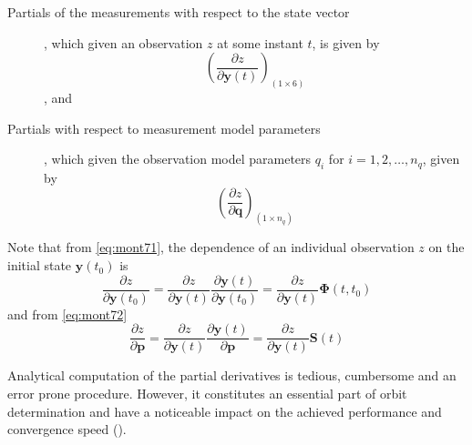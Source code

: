 \begin{description}
  \item[Partials of the measurements with respect to the state vector], which given 
    an observation $z$  at some instant $t$, is given by
    \begin{equation}\label{eq:mont73}
      \left( \frac{\partial z}{\partial \bm{y}(t)} \right) _{(1 \times 6)}
    \end{equation}, and

  \item[Partials with respect to measurement model parameters], which given the observation 
    model parameters $q_i$ for $i=1,2, \dots ,n_q$, given by 
    \begin{equation}\label{eq:mont74}
       \left( \frac{\partial z}{\partial \bm{q}} \right) _{(1 \times n_q)}
    \end{equation}

\end{description}

Note that from \autoref{eq:mont71}, the dependence of an individual observation 
$z$ on the initial state $\bm{y}(t_0)$ is
\begin{equation}
  \frac{\partial z}{\partial \bm{y}(t_0)} = 
    \frac{\partial z}{\partial \bm{y}(t)}\frac{\partial \bm{y}(t)}{\partial \bm{y}(t_0)} 
    = \frac{\partial z}{\partial \bm{y}(t)} \bm{\Phi} (t,t_0)
\end{equation}
and from \autoref{eq:mont72}
\begin{equation}
  \frac{\partial z}{\partial \bm{p}} = 
    \frac{\partial z}{\partial \bm{y}(t)}\frac{\partial \bm{y}(t)}{\partial \bm{p}}
    = \frac{\partial z}{\partial \bm{y}(t)} \bm{S} (t)
\end{equation}

Analytical computation of the partial derivatives is tedious, cumbersome and an 
error prone procedure. However, it constitutes an essential part of orbit determination 
and have a noticeable impact on the achieved performance and convergence speed
(\cite{Montenbruck2000}).

